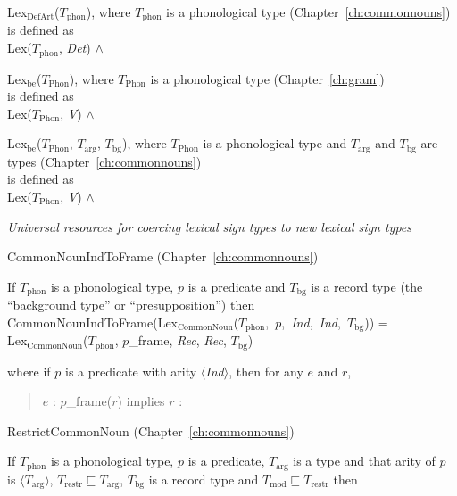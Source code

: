 Lex$_{\mathrm{DefArt}}$($T_{\mathrm{phon}}$), where
  $T_{\mathrm{phon}}$ is a phonological type
  (Chapter~\ref{ch:commonnouns})\\
 is defined as\\ 
Lex($T_{\mathrm{phon}}$, \textit{Det}) \d{$\wedge$} 

Lex$_{\mathrm{be}}$($T_{\mathrm{Phon}}$), where
$T_{\mathrm{Phon}}$ is a phonological type (Chapter~\ref{ch:gram}) \\
is defined as \\
Lex($T_{\mathrm{Phon}}$,
\textit{V}) \d{$\wedge$}

Lex$_{\mathrm{be}}$($T_{\mathrm{Phon}}$, $T_{\mathrm{arg}}$, $T_{\mathrm{bg}}$), where
$T_{\mathrm{Phon}}$ is a phonological type and $T_{\mathrm{arg}}$ and
$T_{\mathrm{bg}}$ are types  (Chapter~\ref{ch:commonnouns}) \\
is defined as \\
Lex($T_{\mathrm{Phon}}$,
\textit{V}) \d{$\wedge$}

\textit{Universal resources for coercing lexical sign types to new
  lexical sign types}

CommonNounIndToFrame (Chapter~\ref{ch:commonnouns})

If $T_{\mathrm{phon}}$ is a phonological type, $p$ is a predicate and
$T_\mathrm{bg}$ is a record type (the ``background type'' or
``presupposition'') then \\ 
\mbox{CommonNounIndToFrame(Lex$_{\mathrm{CommonNoun}}$($T_{\mathrm{phon}}$,
$p$, \textit{Ind}, \textit{Ind}, $T_\mathrm{bg}$))} = \\
Lex$_{\mathrm{CommonNoun}}$($T_{\mathrm{phon}}$,
$p$\_frame, \textit{Rec}, \textit{Rec}, $T_\mathrm{bg}$)

where if $p$ is a predicate with arity $\langle$\textit{Ind}$\rangle$, then
for any $e$ and $r$,  
\begin{quote}
$e$ : $p$\_frame($r$) implies $r$ : 
\end{quote}

RestrictCommonNoun (Chapter~\ref{ch:commonnouns})

If $T_{\mathrm{phon}}$ is a phonological type, $p$ is a predicate,
$T_{\mathrm{arg}}$ is a type and that arity of $p$ is $\langle
T_{\mathrm{arg}}\rangle$, $T_{\mathrm{restr}}\sqsubseteq
T_{\mathrm{arg}}$, $T_{\mathrm{bg}}$ is a record type and
$T_{\mathrm{mod}}\sqsubseteq T_{\mathrm{restr}}$ then

